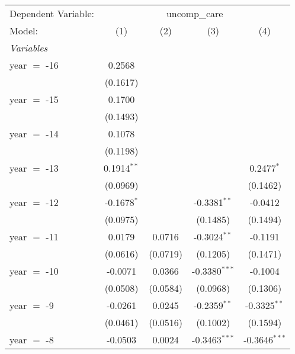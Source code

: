 \begingroup
\centering
\begin{tabular}{lcccc}
   \tabularnewline \midrule \midrule
   Dependent Variable: & \multicolumn{4}{c}{uncomp\_care}\\
   Model:            & (1)             & (2)             & (3)             & (4)\\  
   \midrule
   \emph{Variables}\\
   year $=$ -16      & 0.2568          &                 &                 &   \\   
                     & (0.1617)        &                 &                 &   \\   
   year $=$ -15      & 0.1700          &                 &                 &   \\   
                     & (0.1493)        &                 &                 &   \\   
   year $=$ -14      & 0.1078          &                 &                 &   \\   
                     & (0.1198)        &                 &                 &   \\   
   year $=$ -13      & 0.1914$^{**}$   &                 &                 & 0.2477$^{*}$\\   
                     & (0.0969)        &                 &                 & (0.1462)\\   
   year $=$ -12      & -0.1678$^{*}$   &                 & -0.3381$^{**}$  & -0.0412\\   
                     & (0.0975)        &                 & (0.1485)        & (0.1494)\\   
   year $=$ -11      & 0.0179          & 0.0716          & -0.3024$^{**}$  & -0.1191\\   
                     & (0.0616)        & (0.0719)        & (0.1205)        & (0.1471)\\   
   year $=$ -10      & -0.0071         & 0.0366          & -0.3380$^{***}$ & -0.1004\\   
                     & (0.0508)        & (0.0584)        & (0.0968)        & (0.1306)\\   
   year $=$ -9       & -0.0261         & 0.0245          & -0.2359$^{**}$  & -0.3325$^{**}$\\   
                     & (0.0461)        & (0.0516)        & (0.1002)        & (0.1594)\\   
   year $=$ -8       & -0.0503         & 0.0024          & -0.3463$^{***}$ & -0.3646$^{***}$\\   

\end{tabular}

